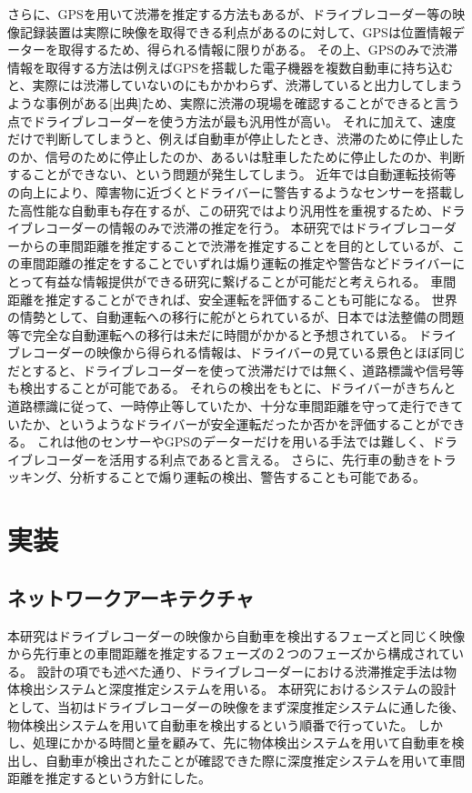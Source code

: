さらに、GPSを用いて渋滞を推定する方法もあるが、ドライブレコーダー等の映像記録装置は実際に映像を取得できる利点があるのに対して、GPSは位置情報データーを取得するため、得られる情報に限りがある。
その上、GPSのみで渋滞情報を取得する方法は例えばGPSを搭載した電子機器を複数自動車に持ち込むと、実際には渋滞していないのにもかかわらず、渋滞していると出力してしまうような事例がある[出典]ため、実際に渋滞の現場を確認することができると言う点でドライブレコーダーを使う方法が最も汎用性が高い。
それに加えて、速度だけで判断してしまうと、例えば自動車が停止したとき、渋滞のために停止したのか、信号のために停止したのか、あるいは駐車したために停止したのか、判断することができない、という問題が発生してしまう。
近年では自動運転技術等の向上により、障害物に近づくとドライバーに警告するようなセンサーを搭載した高性能な自動車も存在するが、この研究ではより汎用性を重視するため、ドライブレコーダーの情報のみで渋滞の推定を行う。
本研究ではドライブレコーダーからの車間距離を推定することで渋滞を推定することを目的としているが、この車間距離の推定をすることでいずれは煽り運転の推定や警告などドライバーにとって有益な情報提供ができる研究に繋げることが可能だと考えられる。
車間距離を推定することができれば、安全運転を評価することも可能になる。
世界の情勢として、自動運転への移行に舵がとられているが、日本では法整備の問題等で完全な自動運転への移行は未だに時間がかかると予想されている。
ドライブレコーダーの映像から得られる情報は、ドライバーの見ている景色とほぼ同じだとすると、ドライブレコーダーを使って渋滞だけでは無く、道路標識や信号等も検出することが可能である。
それらの検出をもとに、ドライバーがきちんと道路標識に従って、一時停止等していたか、十分な車間距離を守って走行できていたか、というようなドライバーが安全運転だったか否かを評価することができる。
これは他のセンサーやGPSのデーターだけを用いる手法では難しく、ドライブレコーダーを活用する利点であると言える。
さらに、先行車の動きをトラッキング、分析することで煽り運転の検出、警告することも可能である。

\newpage
\section{実装}
\subsection{ネットワークアーキテクチャ}
本研究はドライブレコーダーの映像から自動車を検出するフェーズと同じく映像から先行車との車間距離を推定するフェーズの２つのフェーズから構成されている。
設計の項でも述べた通り、ドライブレコーダーにおける渋滞推定手法は物体検出システムと深度推定システムを用いる。
本研究におけるシステムの設計として、当初はドライブレコーダーの映像をまず深度推定システムに通した後、物体検出システムを用いて自動車を検出するという順番で行っていた。
しかし、処理にかかる時間と量を顧みて、先に物体検出システムを用いて自動車を検出し、自動車が検出されたことが確認できた際に深度推定システムを用いて車間距離を推定するという方針にした。


